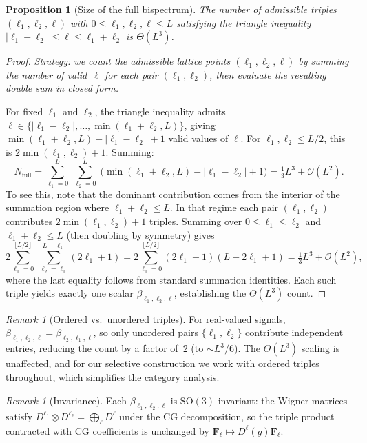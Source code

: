 \documentclass{article}
\theoremstyle{plain}
\newtheorem{proposition}[theorem]{Proposition}
\theoremstyle{definition}
\theoremstyle{remark}
\newtheorem{remark}[theorem]{Remark}
\newcommand{\SO}{\mathrm{SO}}
\begin{document}
\begin{proposition}[Size of the full bispectrum]\label{prop:full-size}
The number of admissible triples $(\ell_1, \ell_2, \ell)$ with
$0 \le \ell_1, \ell_2, \ell \le L$ satisfying the triangle inequality
$|\ell_1 - \ell_2| \le \ell \le \ell_1 + \ell_2$ is $\Theta(L^3)$.
\end{proposition}
\begin{proof}
\emph{Strategy: we count the admissible lattice points
$(\ell_1, \ell_2, \ell)$ by summing the number of valid~$\ell$ for each
pair $(\ell_1, \ell_2)$, then evaluate the resulting double sum in
closed form.}

For fixed $\ell_1$ and $\ell_2$, the triangle inequality admits
$\ell \in \{|\ell_1 - \ell_2|, \dotsc, \min(\ell_1 + \ell_2, L)\}$,
giving $\min(\ell_1 + \ell_2, L) - |\ell_1 - \ell_2| + 1$ valid
values of $\ell$. For $\ell_1, \ell_2 \le L/2$, this is
$2\min(\ell_1, \ell_2) + 1$. Summing:
\[
  N_{\mathrm{full}}
  = \sum_{\ell_1=0}^{L}\;\sum_{\ell_2=0}^{L}\;
    \bigl(\min(\ell_1+\ell_2,L) - |\ell_1-\ell_2| + 1\bigr)
  = \tfrac{1}{3}L^3 + \mathcal{O}(L^2).
\]
To see this, note that the dominant contribution comes from the
interior of the summation region where $\ell_1 + \ell_2 \le L$.
In that regime each pair $(\ell_1, \ell_2)$ contributes
$2\min(\ell_1, \ell_2) + 1$ triples. Summing over
$0 \le \ell_1 \le \ell_2$ and $\ell_1 + \ell_2 \le L$ (then doubling
by symmetry) gives
\[
  2\sum_{\ell_1=0}^{\lfloor L/2\rfloor}\;
    \sum_{\ell_2=\ell_1}^{L-\ell_1}(2\ell_1 + 1)
  = 2\sum_{\ell_1=0}^{\lfloor L/2\rfloor}
    (2\ell_1+1)(L - 2\ell_1 + 1)
  = \tfrac{1}{3}L^3 + \mathcal{O}(L^2),
\]
where the last equality follows from standard summation identities.
Each such triple yields exactly one scalar $\beta_{\ell_1,\ell_2,\ell}$,
establishing the $\Theta(L^3)$ count.
\end{proof}

\begin{remark}[Ordered vs.\ unordered triples]
For real-valued signals, $\beta_{\ell_1,\ell_2,\ell} =
\overline{\beta_{\ell_2,\ell_1,\ell}}$, so only unordered pairs
$\{\ell_1,\ell_2\}$ contribute independent entries, reducing the count
by a factor of~$2$ (to $\sim L^3/6$). The $\Theta(L^3)$ scaling is
unaffected, and for our selective construction we work with ordered
triples throughout, which simplifies the category analysis.
\end{remark}

\begin{remark}[Invariance]
Each $\beta_{\ell_1,\ell_2,\ell}$ is $\SO(3)$-invariant: the Wigner
matrices satisfy $D^{\ell_1} \otimes D^{\ell_2}
= \bigoplus_\ell D^\ell$ under the CG decomposition, so the triple
product contracted with CG coefficients is unchanged by
$\mathbf{F}_\ell \mapsto D^\ell(g)\mathbf{F}_\ell$.
\end{remark}
\end{document}

